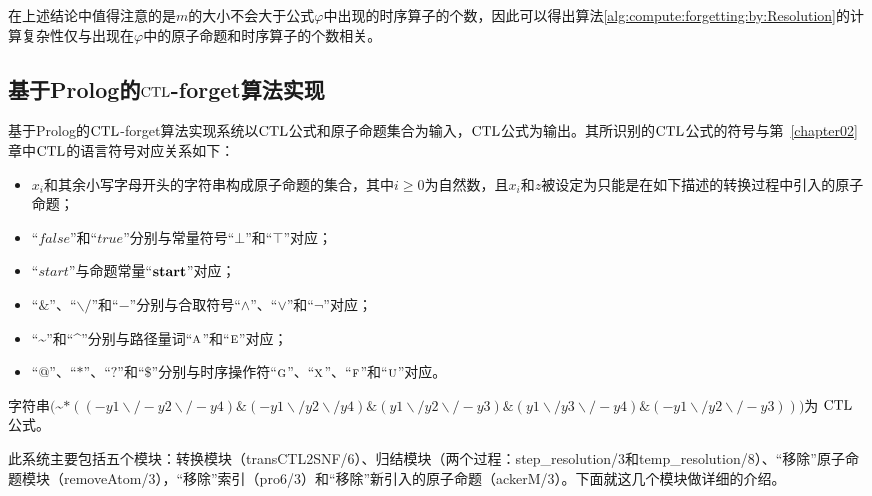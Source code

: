 在上述结论中值得注意的是$m$的大小不会大于公式$\varphi$中出现的时序算子的个数，因此可以得出算法\ref{alg:compute:forgetting:by:Resolution}的计算复杂性仅与出现在$\varphi$中的原子命题和时序算子的个数相关。

\subsection{基于Prolog的$\textrm{CTL}$-forget算法实现}\label{cha5:subsec:prolog}
基于Prolog的$\textrm{CTL}$-forget算法实现系统以$\textrm{CTL}$公式和原子命题集合为输入，$\textrm{CTL}$公式为输出。其所识别的$\textrm{CTL}$公式的符号与第~\ref{chapter02}章中$\textrm{CTL}$的语言符号对应关系如下：
\begin{itemize}
	\item $x_i$和其余小写字母开头的字符串构成原子命题的集合，其中$i\geq 0$为自然数，且$x_i$和$z$被设定为只能是在如下描述的转换过程中引入的原子命题；%
	\item “$false$”和“$true$”分别与常量符号“$\bot$”和“$\top$”对应；
	\item “$start$”与命题常量“$\textbf{start}$”对应；
	\item “$\&$”、“$\backslash/$”和“$-$”分别与合取符号“$\wedge$”、“$\vee$”和“$\neg$”对应；%
	\item “\textasciitilde”和“\textasciicircum”分别与路径量词“$\textsc{a}$”和“$\textsc{e}$”对应；
	\item “$@$”、“$*$”、“$?$”和“$\$$”分别与时序操作符“$\textsc{g}$”、“$\textsc{x}$”、“$\textsc{f}$”和“$\textsc{u}$”对应。
\end{itemize}
\begin{example}
	字符串$($\textasciitilde $* ((-y1\backslash/ -y2\backslash/ -y4)\& (-y1\backslash/y2\backslash/y4)\& (y1\backslash/y2\backslash/ -y3)\& (y1\backslash/y3\backslash/ -y4)\& (-y1\backslash/y2\backslash/ -y3)))$为 $\textrm{CTL}$ 公式。
\end{example}

此系统主要包括五个模块：转换模块（transCTL2SNF/6）、归结模块（两个过程：step\_resolution/3和temp\_resolution/8）、“移除”原子命题模块（removeAtom/3），“移除”索引（pro6/3）和“移除”新引入的原子命题（ackerM/3）。下面就这几个模块做详细的介绍。

